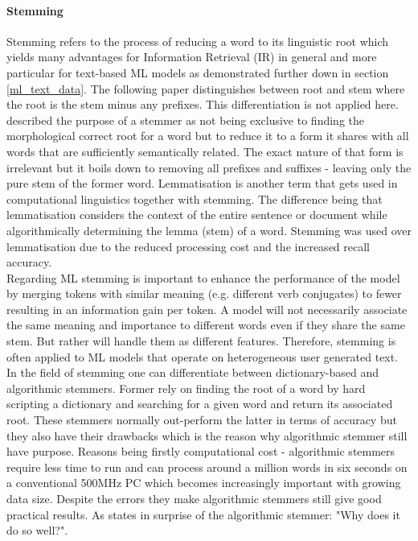 \paragraph*{Stemming} \label{word_stemming}
Stemming refers to the process of reducing a word to its linguistic root which yields many advantages for Information Retrieval (IR) in general and more particular for text-based ML models as demonstrated further down in section \ref{ml_text_data}. The following paper \parencite{Lovins1968} distinguishes between root and stem where the root is the stem minus any prefixes. This differentiation is not applied here. 
\parencite{Weissweiler2018} described the purpose of a stemmer as not being exclusive to finding the morphological correct root for a word but to reduce it to a form it shares with all words that are sufficiently semantically related. The exact nature of that form is irrelevant but it boils down to removing all prefixes and suffixes - leaving only the pure stem of the former word. Lemmatisation is another term that gets used in computational linguistics together with stemming. The difference being that lemmatisation considers the context of the entire sentence or document while algorithmically determining the lemma (stem) of a word. Stemming was used over lemmatisation due to the reduced processing cost and the increased recall accuracy.\\
Regarding ML stemming is important to enhance the performance of the model by merging tokens with similar meaning (e.g. different verb conjugates) to fewer resulting in an information gain per token. A model will not necessarily associate the same meaning and importance to different words even if they share the same stem. But rather will handle them as different features. Therefore, stemming is often applied to ML models that operate on heterogeneous user generated text.\\
In the field of stemming one can differentiate between dictionary-based and algorithmic stemmers. Former rely on finding the root of a word by hard scripting a dictionary and searching for a given word and return its associated root. These stemmers normally out-perform the latter in terms of accuracy but they also have their drawbacks which is the reason why algorithmic stemmer still have purpose. Reasons being firstly computational cost - algorithmic stemmers require less time to run and can process around a million words in six seconds on a conventional 500MHz PC \parencite{Porter2001} which becomes increasingly important with growing data size. Despite the errors they make algorithmic stemmers still give good practical results. As \parencite{Krovetz1995} states in surprise of the algorithmic stemmer: "Why does it do so well?".\\ 
